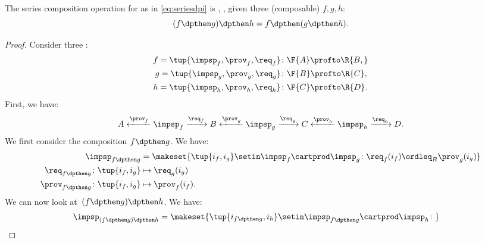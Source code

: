 \begin{lemma}
    \label{lem:dpi-series}
    The series composition operation for  as in \cref{eq:seriesdpi} is , \ie,  given three (composable)  $f,g,h$:
    \begin{equation}
        (f\dpthen g)
        \dpthen h = f\dpthen (g\dpthen h).
    \end{equation}
\end{lemma}
\begin{proof}
    Consider three :
    \begin{equation}
        \begin{aligned}
            f=\tup{{\impsp_f, \prov_f, \req_f} } & \colon \F{A} \profto\R{B,} \\
            g=\tup{\impsp_g, \prov_g, \req_g}    & \colon \F{B} \profto \R{C}, \\
            h=\tup{\impsp_h, \prov_h, \req_h}    & \colon \F{C} \profto \R{D}.
        \end{aligned}
    \end{equation}
    First, we have:
    \begin{equation}
        A \xleftarrow{\prov_f} \impsp_f \xrightarrow{\req_f} B
        \xleftarrow{\prov_g} \impsp_g \xrightarrow{\req_g} C
        \xleftarrow{\prov_h} \impsp_h \xrightarrow{\req_h} D.
    \end{equation}
    We first consider the composition $f\dpthen g$.
    We have:
    \begin{equation}
        \begin{aligned}
            \impsp_{f\dpthen g}                       & = \makeset{
                \tup{i_f,i_g} \setin \impsp_f \cartprod \impsp_g \colon
                \req_f(i_f) \ordleq_{B} \prov_g(i_g)
            } \\
            \req_{f\dpthen g}  \colon  \tup{i_f,i_g}  & \mapsto \req_g(i_g) \\
            \prov_{f\dpthen g}  \colon  \tup{i_f,i_g} & \mapsto \prov_f(i_f).
        \end{aligned}
    \end{equation}
    We can now look at~$(f\dpthen g)\dpthen h$.
    We have:
    \begin{equation}
        \begin{aligned}
             & \impsp_{(f\dpthen g)\dpthen h} = \makeset{
                \tup{i_{f\dpthen g},i_h} \setin \impsp_{f\dpthen g} \cartprod \impsp_{h}\colon
}
\end{aligned}
\end{equation}
\end{proof}
